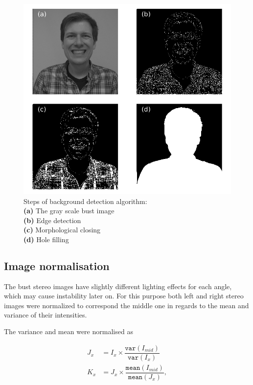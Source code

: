 \documentclass[journal]{IEEEtran}
\begin{document}
\begin{figure}
    \centering
    \includegraphics[width=\linewidth]{BGRemoval.png}
    \caption{Steps of background detection algorithm:\\
        \textbf{(a)} The gray scale bust image\\
        \textbf{(b)} Edge detection\\
        \textbf{(c)} Morphological closing\\
        \textbf{(d)} Hole filling
    }
    \label{fig:backgroundRemoval}
\end{figure}


\subsection{Image normalisation}

The bust stereo images have slightly different lighting effects for each angle, which may cause instability later on.
For this purpose both left and right stereo images were normalized to correspond the middle one in regards to the mean and variance of their intensities.

The variance and mean were normalised as 

\begin{align}
J_{x} &= I_{x} \times \dfrac{\texttt{var}(I_{mid})}{\texttt{var}(I_x)}\\
K_{x} &= J_{x} \times \dfrac{\texttt{mean}(I_{mid})}{\texttt{mean}(J_x)},
\end{align}
\end{document}
